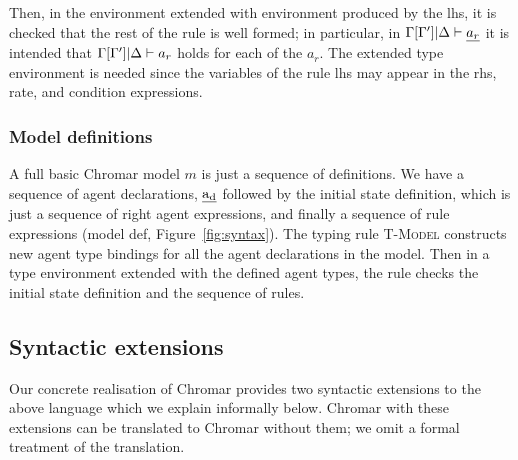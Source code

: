  
 Then, in the environment extended with environment produced by the lhs,  it is checked that the rest of the rule is well formed; in particular, in $ \Gamma[\Gamma']|\Delta \vdash \underline{a_r} $ it is intended that $ \Gamma[\Gamma']|\Delta \vdash a_r $ holds  for each of the $a_r$.   The extended type environment is needed since the variables of the rule lhs may appear in the rhs, rate, and condition expressions.

\subsubsection*{Model definitions}
A full basic Chromar model $m$ is just a sequence of definitions. We have a sequence of agent declarations, $\underline{\mathrm{a_d}}$ followed by the initial state definition, which is just a sequence of right agent expressions, and finally a sequence of rule expressions (\textsf{model def}, Figure~\ref{fig:syntax}). The typing rule \textsc{T-Model} constructs new agent type bindings for all the agent declarations in the model. 
%
Then in a type environment extended with the defined agent types, the rule checks the initial state definition and the sequence of rules.

\subsection{Syntactic extensions}

Our concrete realisation of Chromar provides two syntactic extensions to the above language which we explain informally below. Chromar with these extensions can be translated to Chromar without them; we omit a formal treatment of the translation.



